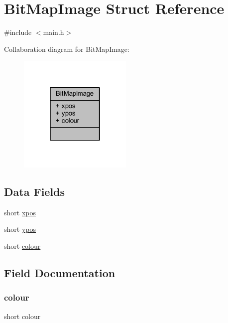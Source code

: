 \hypertarget{struct_bit_map_image}{}\section{Bit\+Map\+Image Struct Reference}
\label{struct_bit_map_image}


{\ttfamily \#include $<$main.\+h$>$}



Collaboration diagram for Bit\+Map\+Image\+:\nopagebreak
\begin{figure}[H]
\begin{center}
\leavevmode
\includegraphics[width=154pt]{struct_bit_map_image__coll__graph}
\end{center}
\end{figure}
\subsection*{Data Fields}
\begin{DoxyCompactItemize}
\item 
short \hyperlink{struct_bit_map_image_afa272b892ec389d3e6315449a783b4a5}{xpos}
\item 
short \hyperlink{struct_bit_map_image_a27e151b8be1e198b2aae1b90b1973af1}{ypos}
\item 
short \hyperlink{struct_bit_map_image_ae80b73433a555becd428dcecb3d9af64}{colour}
\end{DoxyCompactItemize}


\subsection{Field Documentation}
\mbox{\label{struct_bit_map_image_ae80b73433a555becd428dcecb3d9af64}} 
\subsubsection{\texorpdfstring{colour}{colour}}
{\footnotesize\ttfamily short colour}

